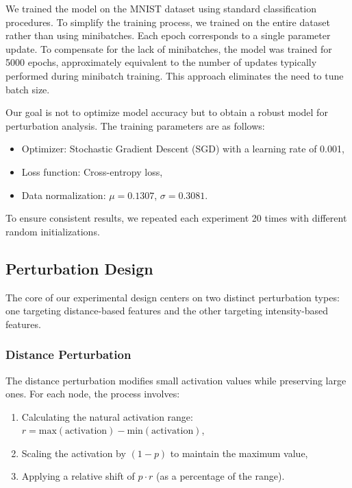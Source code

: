 We trained the model on the MNIST dataset using standard classification procedures. To simplify the training process, we trained on the entire dataset rather than using minibatches. Each epoch corresponds to a single parameter update. To compensate for the lack of minibatches, the model was trained for 5000 epochs, approximately equivalent to the number of updates typically performed during minibatch training. This approach eliminates the need to tune batch size.

Our goal is not to optimize model accuracy but to obtain a robust model for perturbation analysis. The training parameters are as follows:
\begin{itemize}
    \item Optimizer: Stochastic Gradient Descent (SGD) with a learning rate of 0.001,
    \item Loss function: Cross-entropy loss,
    \item Data normalization: $\mu = 0.1307$, $\sigma = 0.3081$.
\end{itemize}

To ensure consistent results, we repeated each experiment 20 times with different random initializations.

\subsection{Perturbation Design}

The core of our experimental design centers on two distinct perturbation types: one targeting distance-based features and the other targeting intensity-based features.

\subsubsection{Distance Perturbation}

The distance perturbation modifies small activation values while preserving large ones. For each node, the process involves:
\begin{enumerate}
    \item Calculating the natural activation range: $r = \text{max}(\text{activation}) - \text{min}(\text{activation})$,
    \item Scaling the activation by $(1 - p)$ to maintain the maximum value,
    \item Applying a relative shift of $p \cdot r$ (as a percentage of the range).
\end{enumerate}

